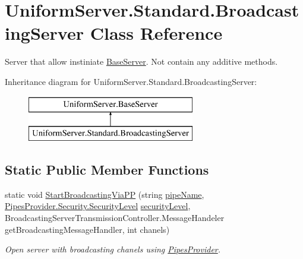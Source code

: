 \hypertarget{class_uniform_server_1_1_standard_1_1_broadcasting_server}{}\section{Uniform\+Server.\+Standard.\+Broadcasting\+Server Class Reference}
\label{class_uniform_server_1_1_standard_1_1_broadcasting_server}


Server that allow instiniate \mbox{\hyperlink{class_uniform_server_1_1_base_server}{Base\+Server}}. Not contain any additive methods.  


Inheritance diagram for Uniform\+Server.\+Standard.\+Broadcasting\+Server\+:\begin{figure}[H]
\begin{center}
\leavevmode
\includegraphics[height=2.000000cm]{d5/dac/class_uniform_server_1_1_standard_1_1_broadcasting_server}
\end{center}
\end{figure}
\subsection*{Static Public Member Functions}
\begin{DoxyCompactItemize}
\item 
static void \mbox{\hyperlink{class_uniform_server_1_1_standard_1_1_broadcasting_server_a1d74214991e5cc82684f85137008e346}{Start\+Broadcasting\+Via\+PP}} (string \mbox{\hyperlink{class_uniform_server_1_1_base_server_aaa318b3ed503dd8ccf381c9f3a81ecf2}{pipe\+Name}}, \mbox{\hyperlink{namespace_pipes_provider_1_1_security_a1a6020eca1c661a6f7140e8260502d7e}{Pipes\+Provider.\+Security.\+Security\+Level}} \mbox{\hyperlink{class_uniform_server_1_1_base_server_ac6297faa957fd1005fc61054bdd1cdb1}{security\+Level}}, Broadcasting\+Server\+Transmission\+Controller.\+Message\+Handeler get\+Broadcasting\+Message\+Handler, int chanels)
\begin{DoxyCompactList}\small\item\em Open server with broadcasting chanels using \mbox{\hyperlink{namespace_pipes_provider}{Pipes\+Provider}}. \end{DoxyCompactList}\end{DoxyCompactItemize}
